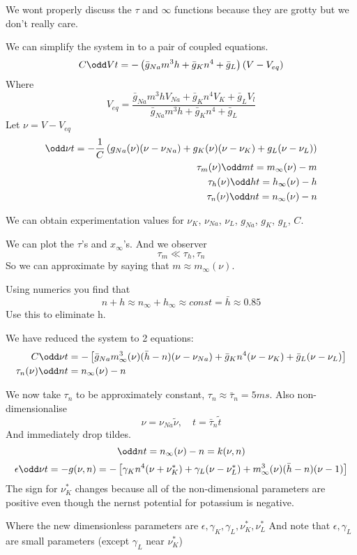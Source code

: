 \documentclass{X:/Documents/Coding/Latex/myassignment}
\begin{document}
We wont properly discuss the $\tau$ and $\infty$ functions because they are grotty but we don't really care.

We can simplify the system in to a pair of coupled equations.
\[C \odd Vt = - \left(\bar{g}_{Na} m^3 h + \bar{g}_{K} n^4 + \bar{g}_L \right)\left(V - V_{eq}\right)\] 
Where
\[V_{eq} = \frac{\bar{g}_{Na} m^3 h V_{Na} + \bar{g}_K n^4 V_{K} + \bar{g}_L V_l}{\bar{g}_{Na} m^3 h + \bar{g}_K n^4 + \bar{g}_L}\]
Let $\nu = V - V_{eq}$
\begin{align*}
	\odd \nu t=  - \frac1C \left(g_{Na} (\nu) (\nu - \nu_{Na}) + g_K(\nu) (\nu- \nu_K) + g_L(\nu - \nu_L)\right)\\
	\tau_m(\nu) \odd mt = m_{\infty}(\nu) - m\\
	\tau_h(\nu) \odd ht = h_{\infty} (\nu) - h\\
	\tau_n(\nu) \odd nt = n_\infty (\nu) - n
\end{align*}

We can obtain experimentation values for $\nu_K$, $\nu_{Na}$, $\nu_L$, $g_{Na}$, $g_K$, $g_L$, $C$.

We can plot the $\tau$'s and $x_{\infty}$'s. And we observer
\[\tau_m \ll \tau_h, \tau_n\]
So we can approximate by saying that $m \approx m_{\infty}(\nu)$.

Using numerics you find that
\[n+h \approx n_{\infty} + h_{\infty} \approx const = \bar{h} \approx 0.85\]
Use this to eliminate h.

We have reduced the system to 2 equations:
\begin{align*}
	C \odd \nu t &= - \left[\bar{g}_{Na} m^3_\infty (\nu) (\bar{h}-n)(\nu - \nu_{Na}) + \bar{g}_{K} n^4 (\nu - \nu_K) + \bar{g}_L (\nu- \nu_L)\right]\\
	\tau_n (\nu) \odd nt &= n_{\infty}(\nu) - n
\end{align*}

We now take $\tau_n$ to be approximately constant, $\tau_n \approx \bar{\tau}_n = 5ms$. Also non-dimensionalise 
\[\nu = \nu_{Na} \tilde{\nu}, \quad t = \bar{\tau}_n \tilde{t}\]
And immediately drop tildes.
\[\odd nt = n_{\infty}(\nu) - n = k(\nu,n)\]
\[\epsilon \odd \nu t = - g(\nu,n) = - \left[\gamma_K n^4(\nu + \nu_K^*) + \gamma_L(\nu - \nu_L^*) + m_\infty^3(\nu) (\bar{h}-n) (\nu-1)\right] \]
The sign for $\nu_K^*$ changes because all of the non-dimensional parameters are positive even though the nernst potential for potassium is negative.


Where the new dimensionless parameters are $\epsilon, \gamma_K, \gamma_L, \nu_K^*, \nu_L^*$
And note that $\epsilon, \gamma_L$ are small parameters (except $\gamma_L$ near $\nu_K^*$)
\end{document}

